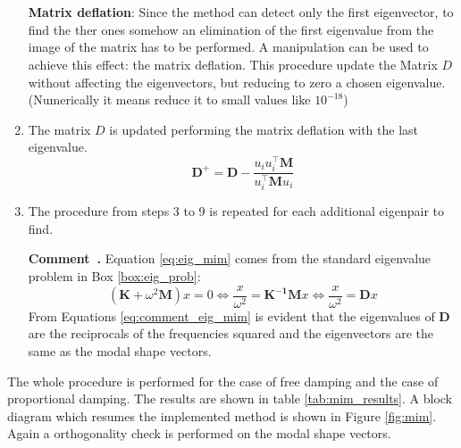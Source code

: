 \documentclass[twosided,a4paper]{article}           %
\newcounter{comment}[section]
\newenvironment{comment}[1][]{\refstepcounter{comment}\par\medskip
	\noindent \textbf{Comment~\thecomment. #1} }{\par}
\newcounter{box}
\newcommand{\tr}{^{{\bm \top}}}
\begin{document}
\begin{enumerate}
		\\ \\
	\noindent\textbf{ Matrix deflation}:
	Since the method can detect only the first eigenvector, to find the ther ones somehow an elimination of the first eigenvalue from the image of the matrix has to be performed. A manipulation can be used to achieve this effect: the matrix deflation. This procedure update the Matrix $D$ without affecting the eigenvectors, but reducing to zero a chosen eigenvalue. (Numerically it means reduce it to small values like $10^{-18}$)
		\item The matrix $D$ is updated performing the matrix deflation with the last eigenvalue.
		\begin{equation}
			\bm{D^+} =\bm{ D} - \dfrac{u_i u_i\tr \bm{M}}{u_i\tr \bm{M} u_i}
		\end{equation}
	\item The procedure from steps 3 to 9 is repeated for each additional eigenpair to find.
		
 \begin{comment}
 \label{com:eig_mim}
 	Equation \eqref{eq:eig_mim} comes from the standard eigenvalue problem in Box \ref{box:eig_prob}:
 	\begin{equation}
 	\label{eq:comment_eig_mim}
 	\left ( \bm{K}+\omega^2\bm{M}\right )x = 0 \Leftrightarrow \dfrac{x}{\omega^2} = \bm{K^{-1}}\bm{M}x \Leftrightarrow \dfrac{x}{\omega^2} = \bm{D}x
 	\end{equation}
 	From Equations \eqref{eq:comment_eig_mim} is evident that the eigenvalues of $\bm{D}$ are the reciprocals of the frequencies squared and the eigenvectors are the same as the modal shape vectors.
 \end{comment}
	\end{enumerate}
The whole procedure is performed for the case of free damping and the case of proportional damping. The results are shown in table \ref{tab:mim_results}.
	A block diagram which resumes the implemented method is shown in Figure \ref{fig:mim}. Again a orthogonality check is performed on the modal shape vectors.
	
	
	
\end{document}
